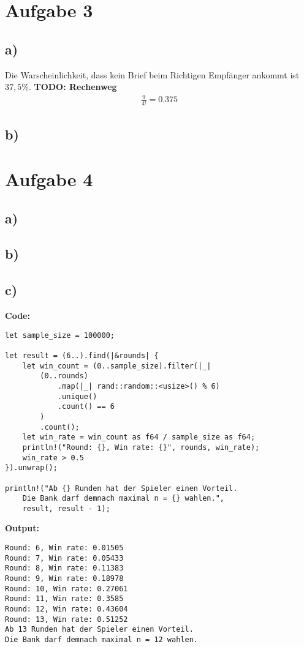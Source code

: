\documentclass[a4paper]{scrartcl}
\begin{document}
\section*{Aufgabe 3}
\subsection*{a)}
Die Warscheinlichkeit, dass kein Brief beim Richtigen Empfänger ankommt ist $37,5\%$.
\textbf{TODO: Rechenweg}
\begin{align*}
    \frac{9}{4!} = 0.375
\end{align*}

\subsection*{b)}

\section*{Aufgabe 4}
\subsection*{a)}

\subsection*{b)}

\subsection*{c)}
\textbf{Code:}
\begin{lstlisting}
let sample_size = 100000;

let result = (6..).find(|&rounds| {
    let win_count = (0..sample_size).filter(|_| 
        (0..rounds)
            .map(|_| rand::random::<usize>() % 6)
            .unique()
            .count() == 6
        )
        .count();
    let win_rate = win_count as f64 / sample_size as f64;
    println!("Round: {}, Win rate: {}", rounds, win_rate);
    win_rate > 0.5
}).unwrap();

println!("Ab {} Runden hat der Spieler einen Vorteil. 
    Die Bank darf demnach maximal n = {} wahlen.", 
    result, result - 1);
\end{lstlisting}

\textbf{Output:}
\begin{lstlisting}
Round: 6, Win rate: 0.01505
Round: 7, Win rate: 0.05433
Round: 8, Win rate: 0.11383
Round: 9, Win rate: 0.18978
Round: 10, Win rate: 0.27061
Round: 11, Win rate: 0.3585
Round: 12, Win rate: 0.43604
Round: 13, Win rate: 0.51252
Ab 13 Runden hat der Spieler einen Vorteil. 
Die Bank darf demnach maximal n = 12 wahlen.
\end{lstlisting}
\end{document}

